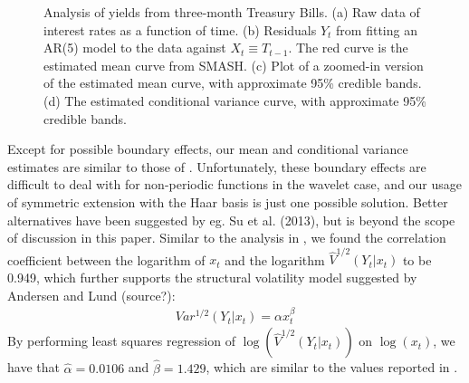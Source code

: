 \documentclass[12pt]{article}
\newcommand{\Ga}{\alpha}
\newcommand{\Gb}{\beta}
\begin{document}
\begin{figure}
\begin{subfigure}[b]{0.4\textwidth}
        \caption{}
        \label{fig:tb_var}
    \end{subfigure}
    \caption{Analysis of yields from three-month Treasury Bills. (a) Raw data of interest rates as a function of time. (b) Residuals $Y_t$ from fitting an AR(5) model to the data against $X_t\equiv T_{t-1}$. The red curve is the estimated mean curve from SMASH. (c) Plot of a zoomed-in version of the estimated mean curve, with approximate 95\% credible bands. (d) The estimated conditional variance curve, with approximate 95\% credible bands.}
\end{figure}

Except for possible boundary effects, our mean and conditional variance estimates are similar to those of \cite{Fan1998Efficient}. Unfortunately, these boundary effects are difficult to deal with for non-periodic functions in the wavelet case, and our usage of symmetric extension with the Haar basis is just one possible solution. Better alternatives have been suggested by eg. Su et al. (2013), but is beyond the scope of discussion in this paper. Similar to the analysis in \cite{Fan1998Efficient}, we found the correlation coefficient between the logarithm of $x_t$ and the logarithm $\hat{V}^{1/2}(Y_t|x_t)$ to be 0.949, which further supports the structural volatility model suggested by Andersen and Lund (source?):
\begin{eqnarray}
Var^{1/2}(Y_t|x_t)=\Ga x_t^{\Gb}
\end{eqnarray}
By performing least squares regression of $\log(\hat{V}^{1/2}(Y_t|x_t))$ on $\log(x_t)$, we have that $\hat{\Ga}=0.0106$ and $\hat{\Gb}=1.429$, which are similar to the values reported in \cite{Fan1998Efficient}.
\newpage
\end{document}
